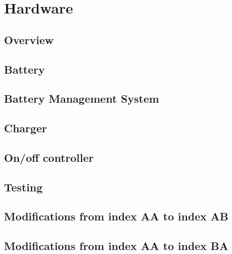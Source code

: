 \section{Hardware}

\FloatBarrier

\subsection{Overview}

\FloatBarrier

\subsection{Battery}
\label{battery}

\subsection{Battery Management System}
\label{sec_bms}

\FloatBarrier

\subsection{Charger}
\label{sec_charger}

\FloatBarrier

\subsection{On/off controller}
\label{sec_onoff}

\FloatBarrier

\subsection{Testing}
\label{sec_testing}

\FloatBarrier

\subsection{Modifications from index AA to index AB}

\subsection{Modifications from index AA to index BA}
